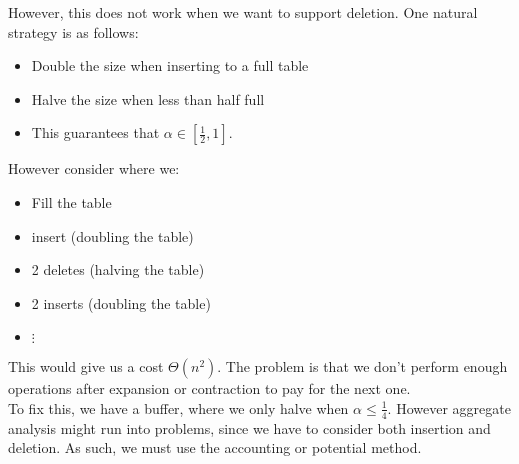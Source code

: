 \documentclass[../main/main.tex]{subfiles}
\begin{document}
However, this does not work when we want to support deletion. One natural strategy is as follows:
\begin{itemize}
	\item Double the size when inserting to a full table
	\item Halve the size when less than half full
	\item This guarantees that $\alpha\in [\frac{1}{2},1]$.
\end{itemize}
However consider where we:
\begin{itemize}
	\item Fill the table
	\item insert (doubling the table)
	\item 2 deletes (halving the table)
	\item 2 inserts (doubling the table)
	\item $\vdots$
\end{itemize}
This would give us a cost $\Theta(n^2)$. The problem is that we don't perform enough operations after expansion or contraction to pay for the next one. \\

To fix this, we have a buffer, where we only halve when $\alpha\le \frac{1}{4}$. However aggregate analysis might run into problems, since we have to consider both insertion and deletion. As such, we must use the accounting or potential method.
\end{document}
